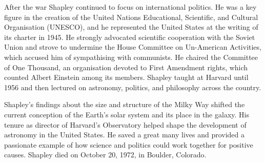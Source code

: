 After the war Shapley continued to focus on international politics. He was a key figure in the creation of the United Nations Educational, Scientific, and Cultural Organisation (UNESCO), and he represented the United States at the writing of its charter in 1945. He strongly advocated scientific cooperation with the Soviet Union and strove to undermine the House Committee on Un-American Activities, which accused him of sympathising with communists. He chaired the Committee of One Thousand, an organisation devoted to First Amendment rights, which counted Albert Einstein among its members. Shapley taught at Harvard until 1956 and then lectured on astronomy, politics, and philosophy across the country.

Shapley's findings about the size and structure of the Milky Way shifted the current conception of the Earth's solar system and its place in the galaxy. His tenure as director of Harvard's Observatory helped shape the development of astronomy in the United States. He saved a great many lives and provided a passionate example of how science and politics could work together for positive causes. Shapley died on October 20, 1972, in Boulder, Colorado.
